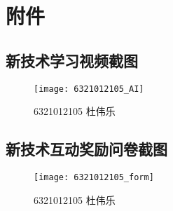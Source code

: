 \chapter{附件}
\section{新技术学习视频截图}
\begin{figure}[htbp]
    \centering
    \texttt{[image: 6321012105\_AI]}
    \caption{6321012105 杜伟乐}\label{fig:6321012105_AI}
    \vspace{\baselineskip}
\end{figure}


\section{新技术互动奖励问卷截图}
\begin{figure}[htbp]
    \centering
    \texttt{[image: 6321012105\_form]}
    \caption{6321012105 杜伟乐}\label{fig:6321012105_form}
    \vspace{\baselineskip}
\end{figure}